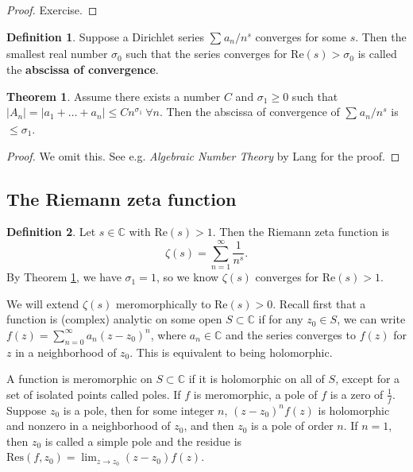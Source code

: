 \documentclass{article}
\theoremstyle{definition}
\newtheorem{theorem}{Theorem}[section]
\newtheorem{defn}{Definition}[section]
\begin{document}
\begin{proof}
    Exercise.
\end{proof}
\begin{defn}\label{defn2.5}
    Suppose a Dirichlet series $\sum_{}^{} a_n/n^s$ converges for some $s$. Then the smallest real number $\sigma_0$ such that the series converges for $\text{Re}(s)>\sigma_0$ is called the \textbf{abscissa of convergence}.
\end{defn}
\begin{theorem}\label{theorem2.6}
    Assume there exists a number $C$ and $\sigma_1\ge 0$ such that $\left|A_n\right|=\left|a_1+\ldots+a_n\right|\le Cn^{\sigma_1} ~\forall n$. Then the abscissa of convergence of $\sum_{}^{} a_n/n^s$ is $\le \sigma_1$.
\end{theorem}
\begin{proof}
    We omit this. See e.g. \textit{Algebraic Number Theory} by Lang for the proof.
\end{proof}
\subsection{The Riemann zeta function}
\begin{defn}\label{defn2.7}
    Let $s \in \mathbb{C}$ with $\text{Re}(s)>1$. Then the Riemann zeta function is \[
    \zeta(s) = \sum_{n=1}^{\infty} \frac{1}{n^s}.
    \]
    By Theorem \ref{theorem2.6}, we have $\sigma_1=1$, so we know $\zeta(s)$ converges for $\text{Re}(s)>1$.
\end{defn}
We will extend $\zeta(s)$ meromorphically to $\text{Re}(s)>0$. Recall first that a function is (complex) analytic on some open $S \subset \mathbb{C}$ if for any $z_0 \in S$, we can write $f(z) = \sum_{n=0}^{\infty} a_n(z-z_0)^n$, where $a_n \in \mathbb{C}$ and the series converges to $f(z)$ for $z$ in a neighborhood of $z_0$. This is equivalent to being holomorphic.
\vspace{1mm}
 
A function is meromorphic on $S \subset \mathbb{C}$ if it is holomorphic on all of $S$, except for a set of isolated points called poles. If $f$ is meromorphic, a pole of $f$ is a zero of $\frac{1}{f}$. Suppose $z_0$ is a pole, then for some integer $n$, $(z-z_0)^nf(z)$ is holomorphic and nonzero in a neighborhood of $z_0$, and then $z_0$ is a pole of order $n$. If $n=1$, then $z_0$ is called a simple pole and the residue is $\text{Res}(f,z_0) = \lim_{z \to z_0}(z-z_0)f(z)$.

\vspace{1mm}
 
\end{document}
